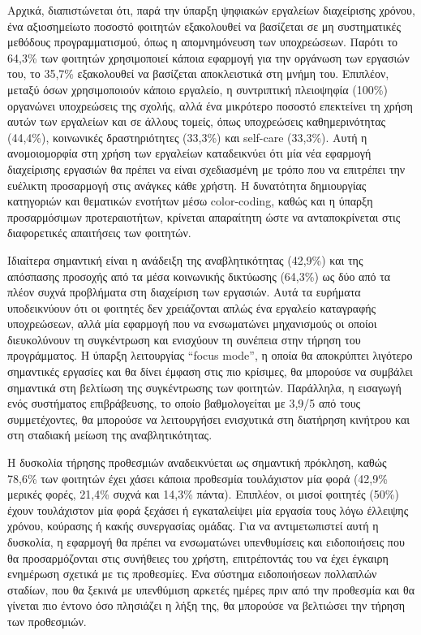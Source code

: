             Αρχικά, διαπιστώνεται ότι, παρά την ύπαρξη ψηφιακών εργαλείων διαχείρισης χρόνου, ένα αξιοσημείωτο ποσοστό φοιτητών εξακολουθεί να βασίζεται σε μη συστηματικές μεθόδους προγραμματισμού, όπως η απομνημόνευση των υποχρεώσεων. Παρότι το 64,3\% των φοιτητών χρησιμοποιεί κάποια εφαρμογή για την οργάνωση των εργασιών του, το 35,7\% εξακολουθεί να βασίζεται αποκλειστικά στη μνήμη του. Επιπλέον, μεταξύ όσων χρησιμοποιούν κάποιο εργαλείο, η συντριπτική πλειοψηφία (100\%) οργανώνει υποχρεώσεις της σχολής, αλλά ένα μικρότερο ποσοστό επεκτείνει τη χρήση αυτών των εργαλείων και σε άλλους τομείς, όπως υποχρεώσεις καθημερινότητας (44,4\%), κοινωνικές δραστηριότητες (33,3\%) και self-care (33,3\%). Αυτή η ανομοιομορφία στη χρήση των εργαλείων καταδεικνύει ότι μία νέα εφαρμογή διαχείρισης εργασιών θα πρέπει να είναι σχεδιασμένη με τρόπο που να επιτρέπει την ευέλικτη προσαρμογή στις ανάγκες κάθε χρήστη. Η δυνατότητα δημιουργίας κατηγοριών και θεματικών ενοτήτων μέσω color-coding, καθώς και η ύπαρξη προσαρμόσιμων προτεραιοτήτων, κρίνεται απαραίτητη ώστε να ανταποκρίνεται στις διαφορετικές απαιτήσεις των φοιτητών.

            Ιδιαίτερα σημαντική είναι η ανάδειξη της αναβλητικότητας (42,9\%) και της απόσπασης προσοχής από τα μέσα κοινωνικής δικτύωσης (64,3\%) ως δύο από τα πλέον συχνά προβλήματα στη διαχείριση των εργασιών. Αυτά τα ευρήματα υποδεικνύουν ότι οι φοιτητές δεν χρειάζονται απλώς ένα εργαλείο καταγραφής υποχρεώσεων, αλλά μία εφαρμογή που να ενσωματώνει μηχανισμούς οι οποίοι διευκολύνουν τη συγκέντρωση και ενισχύουν τη συνέπεια στην τήρηση του προγράμματος. Η ύπαρξη λειτουργίας “focus mode”, η οποία θα αποκρύπτει λιγότερο σημαντικές εργασίες και θα δίνει έμφαση στις πιο κρίσιμες, θα μπορούσε να συμβάλει σημαντικά στη βελτίωση της συγκέντρωσης των φοιτητών. Παράλληλα, η εισαγωγή ενός συστήματος επιβράβευσης, το οποίο βαθμολογείται με 3,9/5 από τους συμμετέχοντες, θα μπορούσε να λειτουργήσει ενισχυτικά στη διατήρηση κινήτρου και στη σταδιακή μείωση της αναβλητικότητας.

            Η δυσκολία τήρησης προθεσμιών αναδεικνύεται ως σημαντική πρόκληση, καθώς 78,6\% των φοιτητών έχει χάσει κάποια προθεσμία τουλάχιστον μία φορά (42,9\% μερικές φορές, 21,4\% συχνά και 14,3\% πάντα). Επιπλέον, οι μισοί φοιτητές (50\%) έχουν τουλάχιστον μία φορά ξεχάσει ή εγκαταλείψει μία εργασία τους λόγω έλλειψης χρόνου, κούρασης ή κακής συνεργασίας ομάδας. Για να αντιμετωπιστεί αυτή η δυσκολία, η εφαρμογή θα πρέπει να ενσωματώνει υπενθυμίσεις και ειδοποιήσεις που θα προσαρμόζονται στις συνήθειες του χρήστη, επιτρέποντάς του να έχει έγκαιρη ενημέρωση σχετικά με τις προθεσμίες. Ένα σύστημα ειδοποιήσεων πολλαπλών σταδίων, που θα ξεκινά με υπενθύμιση αρκετές ημέρες πριν από την προθεσμία και θα γίνεται πιο έντονο όσο πλησιάζει η λήξη της, θα μπορούσε να βελτιώσει την τήρηση των προθεσμιών.

